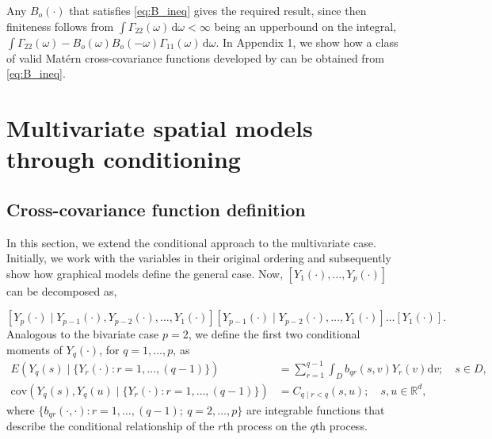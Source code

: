 \documentclass[lineno]{biometrika}
\newcommand{\intd} {\textrm{d}}
\newcommand{\svec} {s}
\newcommand{\uvec} {u}
\newcommand{\omegab} {\omega}
\renewcommand{\v}{v}
\newcommand{\E}{E}
\newcommand{\cov}{\mathrm{cov}}
\begin{document}
Any $B_o(\cdot)$ that satisfies \eqref{eq:B_ineq} gives the required result, since then finiteness follows from $\int\Gamma_{22}(\omegab)\,\intd\omegab < \infty$ being an upperbound on the integral, $\int \Gamma_{22}(\omegab) - B_o(\omegab)B_o(-\omegab)\Gamma_{11}(\omegab)\,\intd\omegab$. In Appendix 1, we show how a class of valid Mat{\'e}rn cross-covariance functions developed by \citet{Gneitingetal2010} can be obtained from \eqref{eq:B_ineq}.


\section{Multivariate spatial models through conditioning}\label{sec:4}

\subsection{Cross-covariance function definition}

In this section, we extend the conditional approach to the multivariate case. Initially, we work with the variables in their original ordering and subsequently show how graphical models define the general case. Now, $[Y_1(\cdot),\dots,Y_p(\cdot)]$ can be decomposed as, 

\begin{equation}\label{eq:decomp}
[Y_p(\cdot) \mid  Y_{p-1}(\cdot),Y_{p-2}(\cdot),\dots,Y_1(\cdot)][Y_{p-1}(\cdot) \mid  Y_{p-2}(\cdot),\dots,Y_1(\cdot)]\dots [Y_1(\cdot)].
\end{equation}
Analogous to the bivariate case $p=2$, we define the first two conditional moments of $Y_q(\cdot)$, for $q = 1,\dots,p$, as
\begin{align}
\E(Y_q(\svec) \mid  \{Y_r(\cdot) : r = 1,\dots,(q-1)\}) &= \sum_{r = 1}^{q-1} \int_D b_{qr}(\svec,\v)Y_r(\v) \intd \v; \quad \svec \in D, \label{eq:E_multi}\\
\cov(Y_q(\svec), Y_q(\uvec) \mid  \{Y_r(\cdot) : r = 1,\dots,(q-1)\}) &= C_{q \mid  r < q}(\svec,\uvec); \quad \svec,\uvec \in \mathbb{R}^d, \label{eq:cov_multi}
\end{align}
where $\{b_{qr}(\cdot,\cdot) : r = 1,\dots,(q-1) ;~q = 2,\dots,p\}$ are integrable functions that describe the conditional relationship of the $r$th process on the $q$th process.
\end{document}
